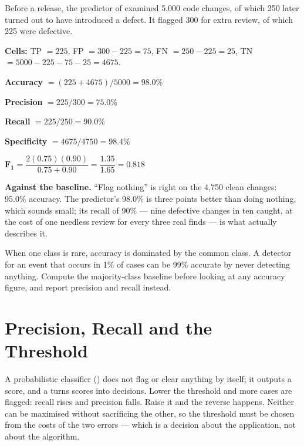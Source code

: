 \begin{worked}
Before a release, the predictor of  examined 5{,}000 code changes,
of which 250 later turned out to have introduced a defect. It flagged 300 for extra
review, of which 225 were defective.

\smallskip
\textbf{Cells:} TP $= 225$, FP $= 300 - 225 = 75$, FN $= 250 - 225 = 25$,
TN $= 5000 - 225 - 75 - 25 = 4675$.

\smallskip
\begin{tight}
  \item \textbf{Accuracy} $= (225 + 4675)/5000 = \mathbf{98.0\%}$
  \item \textbf{Precision} $= 225/300 = \mathbf{75.0\%}$
  \item \textbf{Recall} $= 225/250 = \mathbf{90.0\%}$
  \item \textbf{Specificity} $= 4675/4750 = \mathbf{98.4\%}$
  \item $\mathbf{F_1} = \dfrac{2(0.75)(0.90)}{0.75 + 0.90} = \dfrac{1.35}{1.65} = \mathbf{0.818}$
\end{tight}

\smallskip
\textbf{Against the baseline.} ``Flag nothing'' is right on the 4{,}750 clean
changes: 95.0\% accuracy. The predictor's 98.0\% is three points better than
doing nothing, which sounds small; its recall of 90\% --- nine defective changes
in ten caught, at the cost of one needless review for every three real finds ---
is what actually describes it.
\end{worked}

\begin{alertbox}
When one class is rare, accuracy is dominated by the common class. A detector
for an event that occurs in 1\% of cases can be 99\% accurate by never detecting
anything. Compute the majority-class baseline before looking at any accuracy
figure, and report precision and recall instead.
\end{alertbox}

\section{Precision, Recall and the Threshold}

A probabilistic classifier () does not flag or clear anything by
itself; it outputs a score, and a  turns scores into decisions.
Lower the threshold and more cases are flagged: recall rises and precision falls.
Raise it and the reverse happens. Neither can be maximised without sacrificing
the other, so the threshold must be chosen from the costs of the two errors ---
which is a decision about the application, not about the algorithm.


